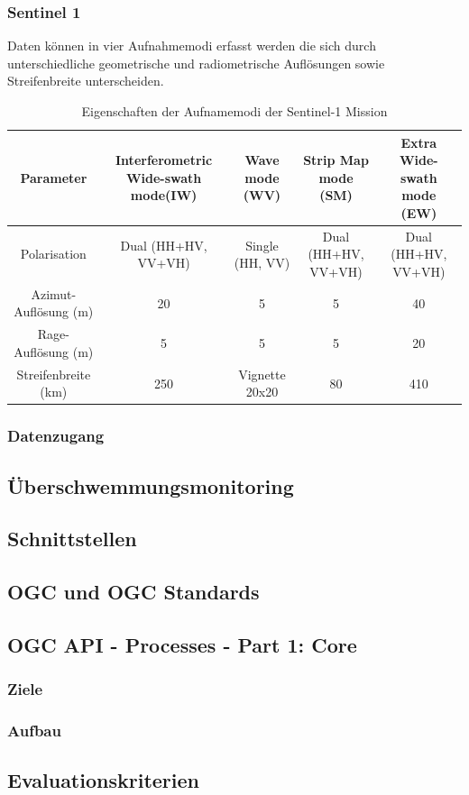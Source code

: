 \subsubsection{Sentinel 1}
Daten können in vier Aufnahmemodi erfasst werden die sich durch unterschiedliche geometrische und radiometrische Auflösungen sowie Streifenbreite unterscheiden.
\begin{table}[htb]
    \caption{Eigenschaften der Aufnamemodi der Sentinel-1 Mission \cite{sentinel_1_overview}}
\begin{center}
    \begin{tabular}{|c|c|c|c|c|} 
        Parameter & Interferometric Wide-swath mode(IW) & Wave mode (WV) & Strip Map mode (SM) & Extra Wide-swath mode (EW) \\ 
        \hline
        Polarisation & Dual (HH+HV, VV+VH) & Single (HH, VV) & Dual (HH+HV, VV+VH) & Dual (HH+HV, VV+VH) \\ 
        Azimut-Auflösung (m) & 20 & 5 & 5 & 40 \\
        Rage-Auflösung (m) & 5 & 5 & 5 & 20 \\
        Streifenbreite (km) & 250 & Vignette 20x20 & 80 & 410\\
    \end{tabular}
    \label{table:1}
\end{center}
\end{table}

\subsubsection{Datenzugang}
\subsection{Überschwemmungsmonitoring}
\subsection{Schnittstellen}
\subsection{OGC und OGC Standards}
\subsection{OGC API - Processes - Part 1: Core}
\subsubsection{Ziele}
\subsubsection{Aufbau}
\subsection{Evaluationskriterien}

